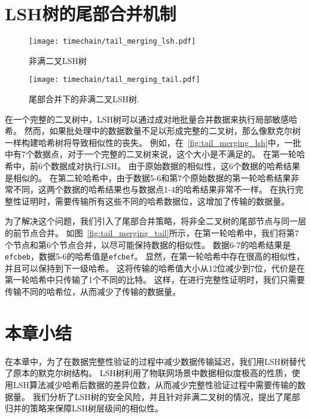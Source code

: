 \section{LSH树的尾部合并机制}

\begin{figure}[t]
    \centering
	\begin{minipage}{0.6\linewidth}
        \centering
        \texttt{[image: timechain/tail\_merging\_lsh.pdf]}
        \caption{非满二叉LSH树}
        \label{fig:tail_merging_lsh}
	\end{minipage}
\end{figure}

\begin{figure}[t]
    \centering
	\begin{minipage}{0.6\linewidth}
        \centering
        \texttt{[image: timechain/tail\_merging\_tail.pdf]}
	\end{minipage}
	\caption{尾部合并下的非满二叉LSH树.}
	\label{fig:tail_merging_tail}
\end{figure}

在一个完整的二叉树中，LSH树可以通过成对地批量合并数据来执行局部敏感哈希。
然而，如果批处理中的数据数量不足以形成完整的二叉树，那么像默克尔树一样构建哈希树将导致相似性的丧失。
例如，在~\autoref{fig:tail_merging_lsh}中，一批中有7个数据点，对于一个完整的二叉树来说，这个大小是不满足的。
在第一轮哈希中，前6个数据成对执行LSH。
由于原始数据的相似性，这6个数据的哈希结果是相似的。
在第二轮哈希中，由于数据5-6和第7个原始数据的第一轮哈希结果非常不同，这两个数据的哈希结果也与数据点1-4的哈希结果非常不一样。
在执行完整性证明时，需要传输所有这些不同的哈希数据位，这增加了传输的数据量。

为了解决这个问题，我们引入了尾部合并策略，将非全二叉树的尾部节点与同一层的前节点合并。
如图~\autoref{fig:tail_merging_tail}所示，在第一轮哈希中，我们将第7个节点和第6个节点合并，以尽可能保持数据的相似性。
数据6-7的哈希结果是\texttt{efcbeb}，数据5-6的哈希值是\texttt{efcbef}。
显然，在第一轮哈希中存在很高的相似性，并且可以保持到下一级哈希。
这将传输的哈希值大小从12位减少到7位，代价是在第一轮哈希中只传输了1个不同的比特。
这样，在进行完整性证明时，我们只需要传输不同的哈希位，从而减少了传输的数据量。

\section{本章小结}
在本章中，为了在数据完整性验证的过程中减少数据传输延迟，我们用LSH树替代了原本的默克尔树结构。
LSH树利用了物联网场景中数据相似度极高的性质，使用LSH算法减少哈希后数据的差异位数，从而减少完整性验证过程中需要传输的数据量。
我们分析了LSH树的安全风险，并且针对非满二叉树的情况，提出了尾部归并的策略来保障LSH树层级间的相似性。

